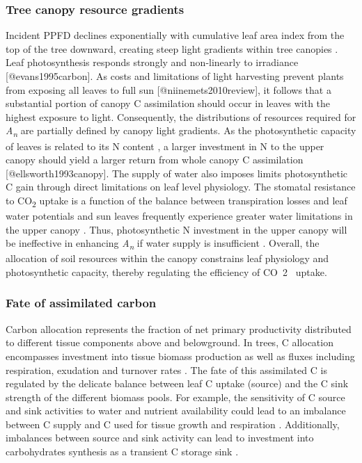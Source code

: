 \documentclass[a4paper]{article}\usepackage[]{graphicx}\usepackage[]{color}
\begin{document}
\subsubsection*{Tree canopy resource gradients}
Incident PPFD declines exponentially with cumulative leaf area index from the top of the tree downward, creating steep light gradients within tree canopies \citep{monsi2005factor}. Leaf photosynthesis responds strongly and non-linearly to irradiance [@evans1995carbon]. As costs and limitations of light harvesting prevent plants from exposing all leaves to full sun [@niinemets2010review], it follows that a substantial portion of canopy C assimilation should occur in leaves with the highest exposure to light. Consequently, the distributions of resources required for \textit{A\textsubscript{n}} are partially defined by canopy light gradients. As the photosynthetic capacity of leaves is related to its N content \citep{field1986photosynthesis}, a larger investment in N to the upper canopy should yield a larger return from whole canopy C assimilation [@ellsworth1993canopy]. The supply of water also imposes limits photosynthetic C gain through direct limitations on leaf level physiology. The stomatal resistance to CO\textsubscript{2} uptake is a function of the balance between transpiration losses and leaf water potentials \citep{farquhar1982stomatal} and sun leaves frequently experience greater water limitations in the upper canopy \citep{sellin2008effects, niinemets2012optimization}. Thus, photosynthetic N investment in the upper canopy will be ineffective in enhancing \textit{A\textsubscript{n}} if water supply is insufficient \citep{niinemets2012optimization, peltoniemi2012co}. Overall, the allocation of soil resources within the canopy constrains leaf physiology and photosynthetic capacity, thereby regulating the efficiency of CO~2~ uptake.    

\subsubsection*{Fate of assimilated carbon}
Carbon allocation represents the fraction of net primary productivity distributed to different tissue components above and belowground. In trees, C allocation encompasses investment into tissue biomass production as well as fluxes including respiration, exudation and turnover rates \citep{litton2007carbon}. The fate of this assimilated C is regulated by the delicate balance between leaf C uptake (source) and the C sink strength of the different biomass pools. For example, the sensitivity of C source and sink activities to water and nutrient availability could lead to an imbalance between C supply and C used for tissue growth and respiration \citep{fatichi2014moving}. Additionally, imbalances between source and sink activity can lead to investment into carbohydrates synthesis as a transient C storage sink \citep{paul2001sink}.
\end{document}
